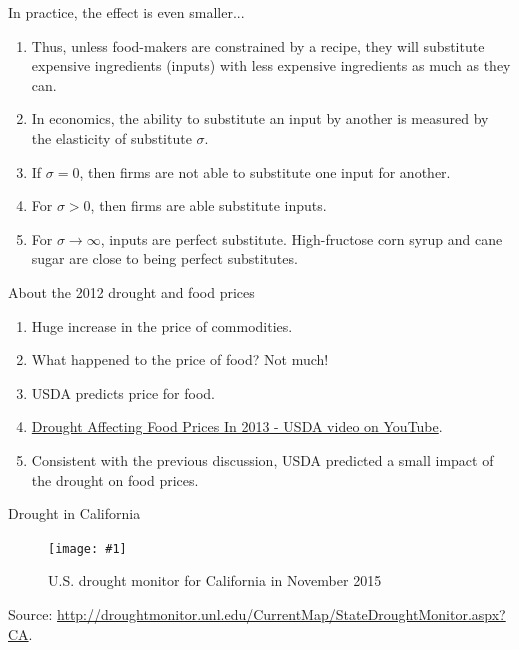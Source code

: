 \documentclass[table,xcolor=pdftex,dvipsnames, handout]{beamer}\usepackage[]{graphicx}\usepackage[]{color}
\newcommand {\framedgraphic}[1] {
        \begin{center}
            \texttt{[image: \#1]}
        \end{center}
        \vspace{-1\baselineskip}
}
\begin{document}
\begin{frame}{In practice, the effect is even smaller...}
\begin{enumerate}[label=\textbullet]
  \item Thus, unless food-makers are constrained by a recipe, they will substitute expensive ingredients (inputs) with less expensive ingredients as much as they can.
  \item In economics, the ability to substitute an input by another is measured by the elasticity of substitute $\sigma$.
  \item If $\sigma=0$, then firms are not able to substitute one input for another.
  \item For $\sigma>0$, then firms are able substitute inputs.
  \item For $\sigma \rightarrow \infty$, inputs are perfect substitute. High-fructose corn syrup and cane sugar are close to being perfect substitutes.
\end{enumerate}
\end{frame}


\begin{frame}{About the 2012 drought and food prices}
\begin{enumerate}[label=\textbullet]
  \item Huge increase in the price of commodities.
  \item What happened to the price of food? Not much!
  \item USDA predicts price for food.
  \item \href{http://www.youtube.com/watch?v=6IZdRqzFed8&list=FLA-0GE7G6Acb_YRgztz-BrQ&index=9}{Drought Affecting Food Prices In 2013 - USDA video on YouTube}.
  \item Consistent with the previous discussion, USDA predicted a small impact of the drought on food prices.
\end{enumerate}
\end{frame}


\begin{frame}{Drought in California}
\begin{figure}[htbp]
\caption{U.S. drought monitor for California in November 2015}
    \framedgraphic{drought_California.png}
\end{figure}
\scriptsize
Source: \url{http://droughtmonitor.unl.edu/CurrentMap/StateDroughtMonitor.aspx?CA}.
\end{frame}
\end{document}
